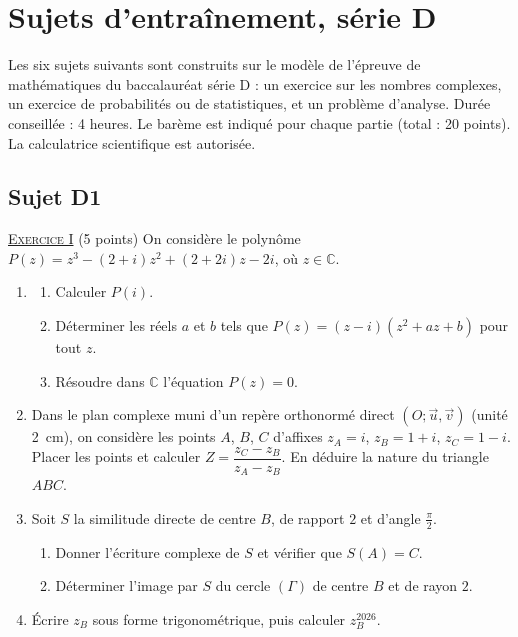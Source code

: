 \chapter{Sujets d'entra\^inement, s\'erie D}
\label{chap:sujets entrainement D}
Les six sujets suivants sont construits sur le mod\`ele de l'\'epreuve de math\'ematiques du baccalaur\'eat s\'erie D :
un exercice sur les nombres complexes, un exercice de probabilit\'es ou de statistiques, et un probl\`eme d'analyse.
Dur\'ee conseill\'ee : 4 heures. Le bar\`eme est indiqu\'e pour chaque partie (total : 20 points).
La calculatrice scientifique est autoris\'ee.

\section{Sujet D1}
\noindent \underline{\textsc{Exercice I}} (5 points) \newline
On consid\`ere le polyn\^ome $P(z) = z^3 - (2+i)z^2 + (2+2i)z - 2i$, o\`u $z \in \mathbb{C}$.
\begin{enumerate}
      \item \begin{enumerate}
            \item Calculer $P(i)$.
            \item D\'eterminer les r\'eels $a$ et $b$ tels que $P(z) = (z - i)(z^2 + az + b)$ pour tout $z$.
            \item R\'esoudre dans $\mathbb{C}$ l'\'equation $P(z) = 0$.
            \end{enumerate}
      \item Dans le plan complexe muni d'un rep\`ere orthonorm\'e direct $(O ; \vec{u}, \vec{v})$ (unit\'e 2~cm),
            on consid\`ere les points $A$, $B$, $C$ d'affixes $z_A = i$, $z_B = 1 + i$, $z_C = 1 - i$.
            Placer les points et calculer $Z = \dfrac{z_C - z_B}{z_A - z_B}$. En d\'eduire la nature du triangle $ABC$.
      \item Soit $S$ la similitude directe de centre $B$, de rapport $2$ et d'angle $\frac{\pi}{2}$.
            \begin{enumerate}
            \item Donner l'\'ecriture complexe de $S$ et v\'erifier que $S(A) = C$.
            \item D\'eterminer l'image par $S$ du cercle $(\Gamma)$ de centre $B$ et de rayon $2$.
            \end{enumerate}
      \item \'Ecrire $z_B$ sous forme trigonom\'etrique, puis calculer $z_B^{2026}$.
\end{enumerate}

